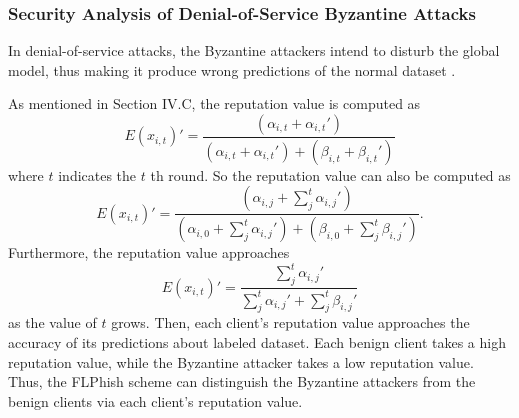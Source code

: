\documentclass[journal]{IEEEtran}
\begin{document}
\subsubsection{Security Analysis of Denial-of-Service Byzantine Attacks}
\par In denial-of-service attacks, the Byzantine attackers intend to disturb the global model, thus making it produce wrong predictions of the normal dataset \cite{ref_04_model,ref_06_model,ref_07_data,yang2017generative,sun2018data}.
\par As mentioned in Section IV.C, the reputation value is computed as
\begin{equation}
  {E(x_{i,t})}'=\frac{(\alpha_{i,t}+{\alpha_{i,t}}')}{(\alpha_{i,t}+{\alpha_{i,t}}')+(\beta_{i,t}+{\beta_{i,t}}')}
\end{equation}
where $t$ indicates the $t$ th round. So the reputation value can also be computed as 
\begin{equation}
  {E(x_{i,t})}'=\frac{(\alpha_{i,j}+\sum_{j}^{t}{\alpha_{i,j}}')}{(\alpha_{i,0}+\sum_{j}^{t} {\alpha_{i,j}}')+(\beta_{i,0}+\sum_{j}^{t}{\beta_{i,j}}')}.
\end{equation}
Furthermore, the reputation value approaches 
\begin{equation}
  {E(x_{i,t})}'=\frac{\sum_{j}^{t}{\alpha_{i,j}}'}{\sum_{j}^{t} {\alpha_{i,j}}'+\sum_{j}^{t}{\beta_{i,j}}'}
\end{equation}
as the value of $t$ grows. Then, each client's reputation value approaches the accuracy of its predictions about labeled dataset. Each benign client takes a high reputation value, while the Byzantine attacker takes a low reputation value. Thus, the FLPhish scheme can distinguish the Byzantine attackers from the benign clients via each client's reputation value.
\end{document}
